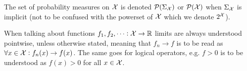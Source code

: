 The set of probability measures on $\mathcal{X}$ is denoted
$\mathcal{P}(\Sigma_\mathcal{X})$ or $\mathcal{P}(\mathcal{X})$ when $\Sigma_\mathcal{X}$ is implicit
(not to be confused with the powerset of $\mathcal{X}$
which we denote $2^{\mathcal{X}}$).

When talking about functions $f_1, f_2, \dots : \mathcal{X} \to \mathbb{R}$
limits are always understood pointwise, unless otherwise stated,
meaning that $f_n \to f$ is to be read as
$\forall x \in \mathcal{X} : f_n(x) \to f(x)$.
The same goes for logical operators, e.g. $f > 0$ is to be understood
as $f(x) > 0$ for all $x \in \mathcal{X}$.


